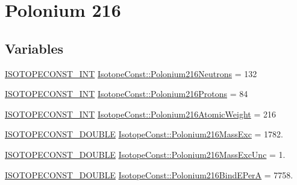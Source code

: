\hypertarget{group___isotope_const-_polonium-_po216}{}\section{Polonium 216}
\label{group___isotope_const-_polonium-_po216}
\subsection*{Variables}
\begin{DoxyCompactItemize}
\item 
\mbox{\hyperlink{group___isotope_const-_macros_ga5f18360b3e99483a35c32d789e62621c}{I\+S\+O\+T\+O\+P\+E\+C\+O\+N\+S\+T\+\_\+\+I\+NT}} \mbox{\hyperlink{group___isotope_const-_polonium-_po216_gaae998a95381bf7c5750ac6762116404f}{Isotope\+Const\+::\+Polonium216\+Neutrons}} = 132
\item 
\mbox{\hyperlink{group___isotope_const-_macros_ga5f18360b3e99483a35c32d789e62621c}{I\+S\+O\+T\+O\+P\+E\+C\+O\+N\+S\+T\+\_\+\+I\+NT}} \mbox{\hyperlink{group___isotope_const-_polonium-_po216_gad6659107e87ab76fa03fd3566a098fbd}{Isotope\+Const\+::\+Polonium216\+Protons}} = 84
\item 
\mbox{\hyperlink{group___isotope_const-_macros_ga5f18360b3e99483a35c32d789e62621c}{I\+S\+O\+T\+O\+P\+E\+C\+O\+N\+S\+T\+\_\+\+I\+NT}} \mbox{\hyperlink{group___isotope_const-_polonium-_po216_gaa1abecbce5fa3130ec83a5a33c87079d}{Isotope\+Const\+::\+Polonium216\+Atomic\+Weight}} = 216
\item 
\mbox{\hyperlink{group___isotope_const-_macros_ga8f45a7272ce02c0b4c65c44636ed719a}{I\+S\+O\+T\+O\+P\+E\+C\+O\+N\+S\+T\+\_\+\+D\+O\+U\+B\+LE}} \mbox{\hyperlink{group___isotope_const-_polonium-_po216_ga10c9364a3d03337589c16ebc598a563e}{Isotope\+Const\+::\+Polonium216\+Mass\+Exc}} = 1782.
\item 
\mbox{\hyperlink{group___isotope_const-_macros_ga8f45a7272ce02c0b4c65c44636ed719a}{I\+S\+O\+T\+O\+P\+E\+C\+O\+N\+S\+T\+\_\+\+D\+O\+U\+B\+LE}} \mbox{\hyperlink{group___isotope_const-_polonium-_po216_ga5d1dbf5f51ebc1f9bfc5741aba793bae}{Isotope\+Const\+::\+Polonium216\+Mass\+Exc\+Unc}} = 1.
\item 
\mbox{\hyperlink{group___isotope_const-_macros_ga8f45a7272ce02c0b4c65c44636ed719a}{I\+S\+O\+T\+O\+P\+E\+C\+O\+N\+S\+T\+\_\+\+D\+O\+U\+B\+LE}} \mbox{\hyperlink{group___isotope_const-_polonium-_po216_gabe9bbe70a6e6512f63892adc791dcb93}{Isotope\+Const\+::\+Polonium216\+Bind\+E\+PerA}} = 7758.
\item 

\end{DoxyCompactItemize}
